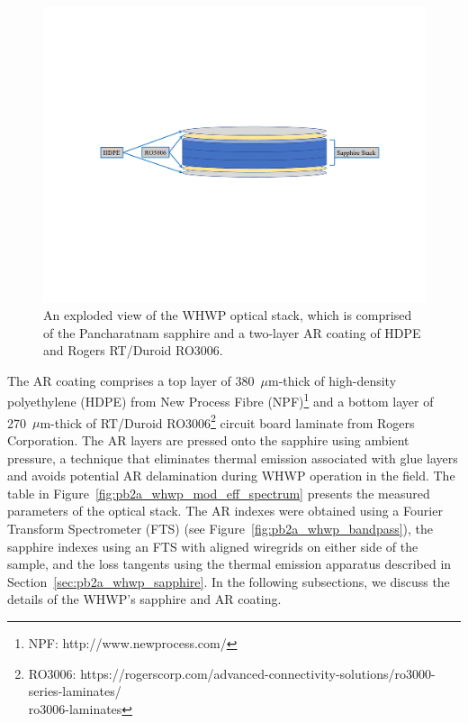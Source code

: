 \begin{figure}[!t]
    \centering
    \includegraphics[width=\linewidth, trim=4cm 9cm 3cm 8cm, clip]{PB2aWHWP/Figures/pb2a_whwp_optical_stack_exploded.pdf}
    \caption{An exploded view of the WHWP optical stack, which is comprised of the Pancharatnam sapphire and a two-layer AR coating of HDPE and Rogers RT/Duroid RO3006.}
    \label{fig:pb2a_whwp_optical_stack_exploded}
\end{figure}

The AR coating comprises a top layer of 380~$\mu$m-thick of high-density polyethylene (HDPE)  from New Process Fibre (NPF)\footnote{NPF: http://www.newprocess.com/} and a bottom layer of 270~$\mu$m-thick of RT/Duroid RO3006\footnote{RO3006: https://rogerscorp.com/advanced-connectivity-solutions/ro3000-series-laminates/ \\ ro3006-laminates} circuit board laminate from Rogers Corporation. The AR layers are pressed onto the sapphire using ambient pressure, a technique that eliminates thermal emission associated with glue layers and avoids potential AR delamination during WHWP operation in the field. The table in Figure~\ref{fig:pb2a_whwp_mod_eff_spectrum} presents the measured parameters of the optical stack. The AR indexes were obtained using a Fourier Transform Spectrometer (FTS) (see Figure~\ref{fig:pb2a_whwp_bandpass}), the sapphire indexes using an FTS with aligned wiregrids on either side of the sample, and the loss tangents using the thermal emission apparatus described in Section~\ref{sec:pb2a_whwp_sapphire}. In the following subsections, we discuss the details of the WHWP's sapphire and AR coating.

